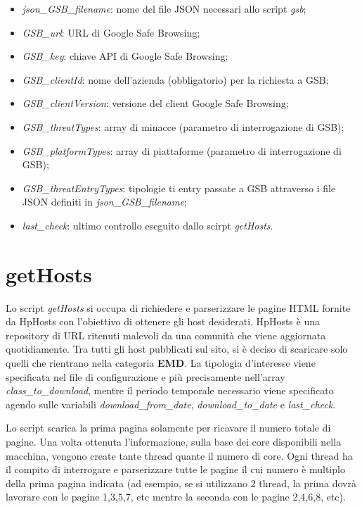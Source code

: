 \documentclass[a4paper, 11pt, oneside]{report}
\begin{document}
\begin{itemize}
	\item{\textit{json\_GSB\_filename}}: nome del file JSON necessari allo script \textit{gsb};
	\item{\textit{GSB\_url}}: URL di Google Safe Browsing;
	\item{\textit{GSB\_key}}: chiave API di Google Safe Browsing;
	\item{\textit{GSB\_clientId}}: nome dell'azienda (obbligatorio) per la richiesta a GSB;
	\item{\textit{GSB\_clientVersion}}: versione del client Google Safe Browsing;
    \item{\textit{GSB\_threatTypes}}: array di minacce (parametro di interrogazione di GSB);
    \item{\textit{GSB\_platformTypes}}: array di piattaforme (parametro di interrogazione di GSB);
    \item{\textit{GSB\_threatEntryTypes}}: tipologie ti entry passate a GSB attraverso i file JSON definiti in \textit{json\_GSB\_filename};
    \item{\textit{last\_check}}: ultimo controllo eseguito dallo scirpt \textit{getHosts}.
\end{itemize}


\section{getHosts}
Lo script \textit{getHosts} si occupa di richiedere e parserizzare le pagine HTML fornite da HpHosts con l'obiettivo di ottenere gli host desiderati. HpHosts è una repository di URL ritenuti malevoli da una comunità che viene aggiornata quotidiamente. Tra tutti gli host pubblicati sul sito, si è deciso di scaricare solo quelli che rientrano nella categoria \textbf{EMD}. La tipologia d'interesse viene specificata nel file di configurazione e più precisamente nell'array \textit{class\_to\_download}, mentre il periodo temporale necessario viene specificato agendo sulle variabili \textit{download\_from\_date}, \textit{download\_to\_date} e \textit{last\_check}. 

Lo script scarica la prima pagina solamente per ricavare il numero totale di pagine. Una volta ottenuta l'informazione, sulla base dei core disponibili nella macchina, vengono create tante thread quante il numero di core. Ogni thread ha il compito di interrogare e parserizzare tutte le pagine il cui numero è multiplo della prima pagina indicata (ad esempio, se si utilizzano 2 thread, la prima dovrà lavorare con le pagine 1,3,5,7, etc mentre la seconda con le pagine 2,4,6,8, etc).
\end{document}
